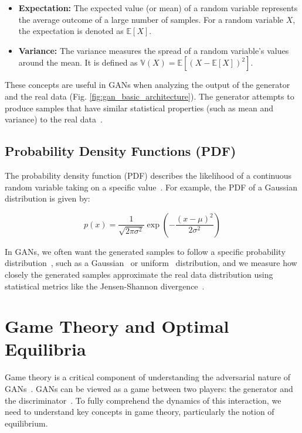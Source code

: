 \begin{itemize}
    \item \textbf{Expectation:} The expected value (or mean) of a random variable represents the average outcome of a large number of samples. For a random variable \( X \), the expectation is denoted as \( \mathbb{E}[X] \).
    \item \textbf{Variance:} The variance measures the spread of a random variable's values around the mean. It is defined as \( \mathbb{V}(X) = \mathbb{E}[(X - \mathbb{E}[X])^2] \).
\end{itemize}

These concepts are useful in GANs when analyzing the output of the generator and the real data (Fig. \ref{fig:gan_basic_architecture}). The generator attempts to produce samples that have similar statistical properties (such as mean and variance) to the real data~\cite{srivastava2017veegan, he2018probgan}.

\subsection{Probability Density Functions (PDF)}
The probability density function (PDF) describes the likelihood of a continuous random variable taking on a specific value~\cite{parzen1962estimation, saatci2017bayesian}. For example, the PDF of a Gaussian distribution is given by:

\[
p(x) = \frac{1}{\sqrt{2 \pi \sigma^2}} \exp\left(-\frac{(x - \mu)^2}{2 \sigma^2}\right)
\]

In GANs, we often want the generated samples to follow a specific probability distribution~\cite{goodfellow2014generative}, such as a Gaussian~\cite{goodman1963statistical} or uniform~\cite{kuipers2012uniform} distribution, and we measure how closely the generated samples approximate the real data distribution using statistical metrics like the Jensen-Shannon divergence~\cite{menendez1997jensen, fuglede2004jensen}.

\section{Game Theory and Optimal Equilibria}
Game theory is a critical component of understanding the adversarial nature of GANs~\cite{fudenberg1991game, farnia2020gans}. GANs can be viewed as a game between two players: the generator and the discriminator~\cite{goodfellow2014generative}. To fully comprehend the dynamics of this interaction, we need to understand key concepts in game theory, particularly the notion of equilibrium.

